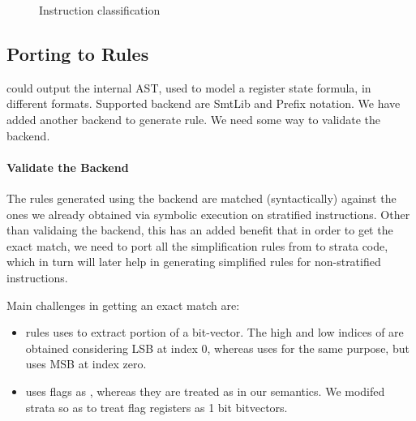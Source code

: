 \begin{figure*}[t]
\centering
{}
\caption{Instruction classification\label{fig:instr_class}}
\end{figure*}

\subsection{Porting to \K Rules}

\Strata could output the internal AST, used to model a register state formula, in different
formats. Supported backend are SmtLib and Prefix notation. We have added another backend 
to generate \K rule. We need some way to validate the backend. 

\paragraph{Validate the Backend}

The \K rules generated using the backend are matched (syntactically)  against
the ones we already obtained via symbolic execution on stratified instructions.
Other than validaing the backend, this has an added benefit that in order to get
the exact match, we need to port all the simplification rules from \K to strata
code, which in turn will later help in generating simplified \K rules for
non-stratified instructions. 

Main challenges in getting an exact match are:
\begin{itemize}

\item  \Strata rules uses \extract to extract portion of a bit-vector. The high
and low indices of \extract are obtained considering LSB at index 0, whereas \K
uses \extractMInt for the same purpose, but uses MSB at index zero.

\item  \Strata uses flags as \bool, whereas they are treated as \bv in our
semantics. We modifed strata so as to treat flag registers as 1 bit bitvectors.

\end{itemize}


